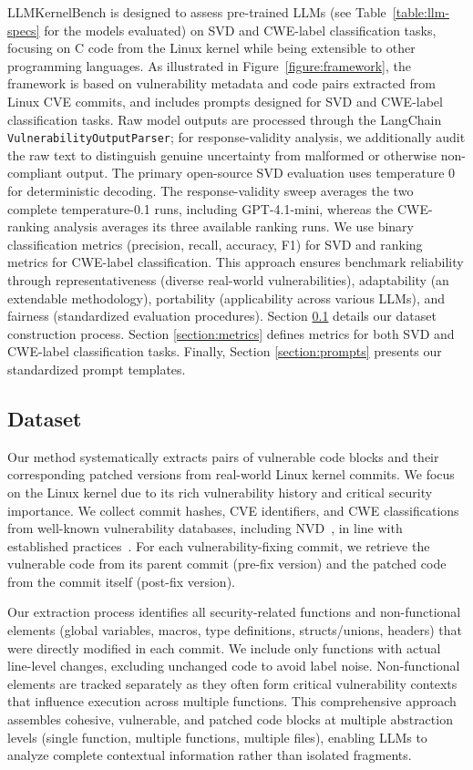 \documentclass[lettersize,journal]{IEEEtran}
\begin{document}
LLMKernelBench is designed to assess pre-trained \glspl{LLM} (see Table~\ref{table:llm-specs} for the models evaluated) on \gls{SVD} and CWE-label classification tasks, focusing on C code from the Linux kernel while being extensible to other programming languages. As illustrated in Figure~\ref{figure:framework}, the framework is based on vulnerability metadata and code pairs extracted from Linux CVE commits, and includes prompts designed for \gls{SVD} and CWE-label classification tasks. Raw model outputs are processed through the LangChain \texttt{VulnerabilityOutputParser}; for response-validity analysis, we additionally audit the raw text to distinguish genuine uncertainty from malformed or otherwise non-compliant output. The primary open-source SVD evaluation uses temperature 0 for deterministic decoding. The response-validity sweep averages the two complete temperature-0.1 runs, including GPT-4.1-mini, whereas the CWE-ranking analysis averages its three available ranking runs. We use binary classification metrics (precision, recall, accuracy, F1) for \gls{SVD} and ranking metrics for CWE-label classification. This approach ensures benchmark reliability through representativeness (diverse real-world vulnerabilities), adaptability (an extendable methodology), portability (applicability across various \glspl{LLM}), and fairness (standardized evaluation procedures).
Section \ref{section:dataset} details our dataset construction process. Section \ref{section:metrics} defines metrics for both \gls{SVD} and CWE-label classification tasks. Finally, Section \ref{section:prompts} presents our standardized prompt templates.


\subsection{Dataset}
\label{section:dataset}
Our method systematically extracts pairs of vulnerable code blocks and their corresponding patched versions from real-world Linux kernel commits. We focus on the Linux kernel due to its rich vulnerability history and critical security importance. We collect commit hashes, CVE identifiers, and \gls{CWE} classifications from well-known vulnerability databases, including NVD~\cite{nvd2025}, in line with established practices~\cite{pereira2022software}. For each vulnerability-fixing commit, we retrieve the vulnerable code from its parent commit (pre-fix version) and the patched code from the commit itself (post-fix version).

Our extraction process identifies all security-related functions and non-functional elements (global variables, macros, type definitions, structs/unions, headers) that were directly modified in each commit. We include only functions with actual line-level changes, excluding unchanged code to avoid label noise. Non-functional elements are tracked separately as they often form critical vulnerability contexts that influence execution across multiple functions. This comprehensive approach assembles cohesive, vulnerable, and patched code blocks at multiple abstraction levels (single function, multiple functions, multiple files), enabling \glspl{LLM} to analyze complete contextual information rather than isolated fragments.
\end{document}
